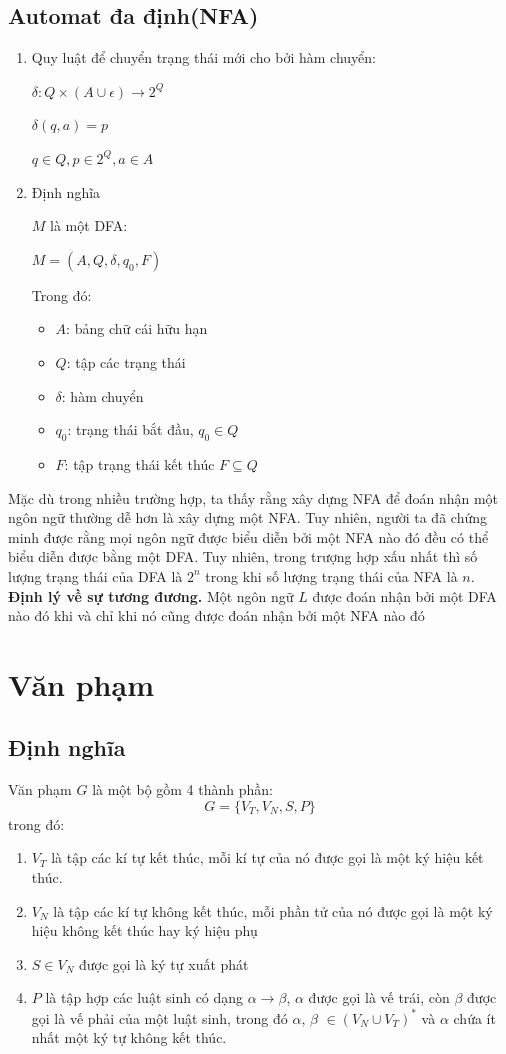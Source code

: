 \documentclass[14pt]{extreport}
\begin{document}
\subsection{Automat đa định(NFA)}
\begin{enumerate}
\item Quy luật để chuyển trạng thái mới cho bởi hàm chuyển:

$\delta: Q \times \left(A\cup \epsilon\right) \rightarrow 2^Q$

$\delta(q,a)=p$

$q\in Q, p \in 2^Q, a\in A$
\item Định nghĩa

$M$ là một DFA:
\begin{center}
$M=\left(A,Q,\delta,q_0,F\right)$
\end{center}
Trong đó:
\begin{itemize}
\item $A$: bảng chữ cái hữu hạn
\item $Q$: tập các trạng thái
\item $\delta$: hàm chuyển
\item $q_0$: trạng thái bắt đầu, $q_0 \in Q$
\item $F$: tập trạng thái kết thúc $F\subseteq Q$
\end{itemize}
\end{enumerate}
Mặc dù trong nhiều trường hợp, ta thấy rằng xây dựng NFA để đoán nhận một ngôn ngữ thường dễ hơn là xây dựng một NFA. Tuy nhiên, người ta đã chứng minh được rằng mọi ngôn ngữ được biểu diễn bởi một NFA nào đó đều có thể biểu diễn được bằng một DFA. Tuy nhiên, trong trượng hợp xấu nhất thì số lượng trạng thái của DFA là $2^n$ trong khi số lượng trạng thái của NFA là $n$. \\
\textbf{Định lý về sự tương đương.} Một ngôn ngữ $L$ được đoán nhận bởi một DFA nào đó khi và chỉ khi nó cũng được đoán nhận bởi một NFA nào đó
\section{Văn phạm}
\subsection{Định nghĩa}
Văn phạm $G$ là một bộ gồm 4 thành phần:
$$G = \{ V_T, V_N, S, P \}$$
trong đó:\\
\begin{enumerate}
\item $V_T$ là tập các kí tự kết thúc, mỗi kí tự của nó được gọi là một ký hiệu kết thúc.
\item $V_N$ là tập các kí tự không kết thúc, mỗi phần tử của nó được gọi là một ký hiệu không kết thúc hay ký hiệu phụ
\item $S \in V_N$ được gọi là ký tự xuất phát
\item $P$ là tập hợp các luật sinh có dạng $\alpha \rightarrow \beta$, $\alpha$ được gọi là vế trái, còn $\beta$ được gọi là vế phải của một luật sinh, trong đó $\alpha$, $\beta$ $\in (V_N \cup V_T)^*$ và $\alpha$ chứa ít nhất một ký tự không kết thúc.
\end{enumerate}
\end{document}
